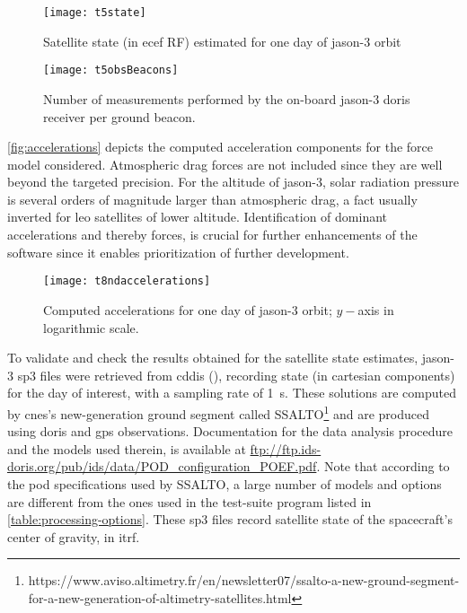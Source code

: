\begin{figure}[ht]
    \centering
    \texttt{[image: t5state]}
    \caption{Satellite state (in \gls{ecef} RF) estimated for one day of \gls{jason}-3 orbit}
    \label{fig:state}
\end{figure}

\begin{figure}[ht]
    \centering
    \texttt{[image: t5obsBeacons]}
    \caption{Number of measurements performed by the on-board \gls{jason}-3 \gls{doris} receiver per ground beacon.}
    \label{fig:obsPerBeacon}
\end{figure}

\autoref{fig:accelerations} depicts the computed acceleration components for the 
force model considered. %
Atmospheric drag forces are not included since they are well beyond the targeted precision.
For the altitude 
of \gls{jason}-3, solar radiation pressure is several orders of magnitude larger than 
atmospheric drag, a fact usually inverted for \gls{leo} satellites of lower 
altitude. Identification of dominant accelerations and thereby forces, is crucial 
for further enhancements of the software since it enables prioritization of further 
development.

\begin{figure}[ht]
    \centering
    \texttt{[image: t8ndaccelerations]}
    \caption{Computed accelerations for one day of \gls{jason}-3 orbit; $y-$axis in logarithmic scale.}
    \label{fig:accelerations}
\end{figure}

To validate and check the results obtained for the satellite state estimates, 
\gls{jason}-3 sp3 files were retrieved from \gls{cddis} (\cite{Noll2010}), recording 
state (in cartesian components) for the day of interest, with a sampling rate of 
\SI{1}{\second}. These solutions are computed by \gls{cnes}'s new-generation ground segment 
called SSALTO\footnote{https://www.aviso.altimetry.fr/en/newsletter07/ssalto-a-new-ground-segment-for-a-new-generation-of-altimetry-satellites.html} 
and are produced using \gls{doris} and \gls{gps} observations. Documentation 
for the data analysis procedure and the models used therein, is available at 
\url{ftp://ftp.ids-doris.org/pub/ids/data/POD_configuration_POEF.pdf}. Note that 
according to the \gls{pod} specifications used by SSALTO, a large number of models 
and options are different from the ones used in the test-suite program listed in 
\autoref{table:processing-options}. These sp3 files record satellite state of the 
spacecraft's center of gravity, in \gls{itrf}.


